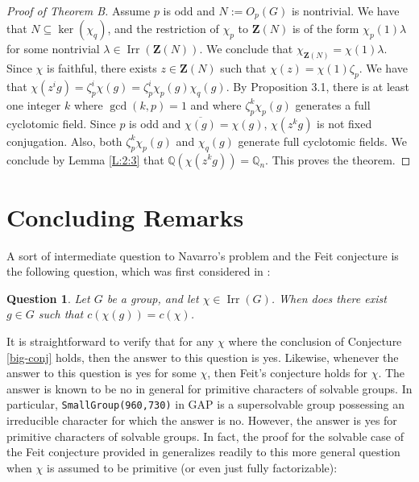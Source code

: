 \documentclass[12pt]{amsart}
\newtheorem{question}[theorem]{Question}
\theoremstyle{definition}
\newcommand{\Q}{\mathbb{Q}}
\newcommand{\ol}{\overline}
\DeclareMathOperator{\Irr}{Irr}
\newcommand{\Cent}{\mathbf{Z}}
\begin{document}
\begin{proof}[Proof of Theorem B]
	Assume $p$ is odd and $N:= O_p(G)$ is nontrivial. We have that $N \subseteq \ker(\chi_q)$, and the restriction of $\chi_p$ to $\Cent(N)$ is of the form $\chi_p(1)\lambda$ for some nontrivial $\lambda \in \Irr(\Cent(N))$. We conclude that $\chi_{\Cent(N)} = \chi(1)\lambda$. Since $\chi$ is faithful, there exists $z \in \Cent(N)$ such that $\chi(z) = \chi(1)\zeta_p$. We have that $\chi(z^ig) = \zeta_p^i\chi(g) = \zeta_p^i\chi_{p}(g)\chi_q(g)$. By Proposition 3.1, there is at least one integer $k$ where $\gcd(k,p) = 1$ and where $\zeta_p^k\chi_p(g)$ generates a full cyclotomic field. Since $p$ is odd and $\ol{\chi(g)} = \chi(g)$, $\chi(z^kg)$ is not fixed conjugation. Also, both $\zeta_p^k\chi_p(g)$ and $\chi_q(g)$ generate full cyclotomic fields. We conclude by Lemma \ref{L:2:3} that $\Q(\chi(z^kg)) = \Q_n$. This proves the theorem.
\end{proof}

\section{Concluding Remarks}

A sort of intermediate question to Navarro's problem and the Feit conjecture is the following question, which was first considered in \cite{HH}:

\begin{question}
	Let $G$ be a group, and let $\chi \in \Irr(G)$. When does there exist $g \in G$ such that $c(\chi(g)) = c(\chi)$.
\end{question}

It is straightforward to verify that for any $\chi$ where the conclusion of Conjecture \ref{big-conj} holds, then the answer to this question is yes. Likewise, whenever the answer to this question is yes for some $\chi$, then Feit's conjecture holds for $\chi$. The answer is known to be no in general for primitive characters of solvable groups. In particular, \texttt{SmallGroup(960,730)} in GAP \cite{Gap} is a supersolvable group possessing an irreducible character for which the answer is no. However, the answer is yes for primitive characters of solvable groups. In fact, the proof for the solvable case of the Feit conjecture provided in \cite[Theorem 2.22]{Is2} generalizes readily to this more general question when $\chi$ is assumed to be primitive (or even just fully factorizable):
\end{document}
